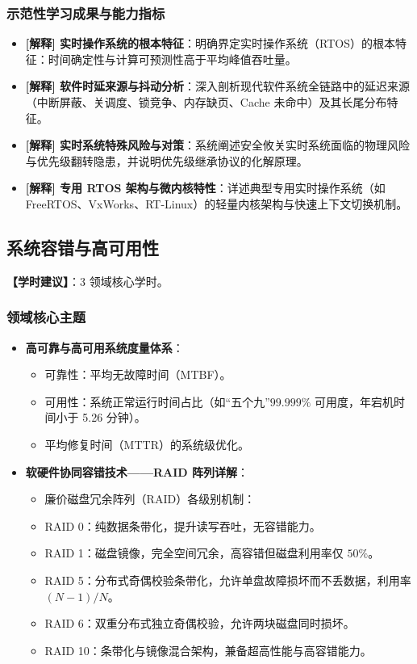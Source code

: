 \subsubsection{示范性学习成果与能力指标}
\begin{itemize}\setlength{\itemsep}{0pt}\setlength{\parskip}{0pt}
    \item \textbf{[解释] 实时操作系统的根本特征}：明确界定实时操作系统（RTOS）的根本特征：时间确定性与计算可预测性高于平均峰值吞吐量。
    \item \textbf{[解释] 软件时延来源与抖动分析}：深入剖析现代软件系统全链路中的延迟来源（中断屏蔽、关调度、锁竞争、内存缺页、Cache 未命中）及其长尾分布特征。
    \item \textbf{[解释] 实时系统特殊风险与对策}：系统阐述安全攸关实时系统面临的物理风险与优先级翻转隐患，并说明优先级继承协议的化解原理。
    \item \textbf{[解释] 专用 RTOS 架构与微内核特性}：详述典型专用实时操作系统（如 FreeRTOS、VxWorks、RT-Linux）的轻量内核架构与快速上下文切换机制。
\end{itemize}

\subsection{系统容错与高可用性}
\textbf{【学时建议】}：3 领域核心学时。

\subsubsection{领域核心主题}
\begin{itemize}\setlength{\itemsep}{0pt}\setlength{\parskip}{0pt}
    \item \textbf{高可靠与高可用系统度量体系}：
    \begin{itemize}\setlength{\itemsep}{0pt}\setlength{\parskip}{0pt}
        \item 可靠性：平均无故障时间（MTBF）。
        \item 可用性：系统正常运行时间占比（如“五个九”$99.999\%$ 可用度，年宕机时间小于 5.26 分钟）。
        \item 平均修复时间（MTTR）的系统级优化。
    \end{itemize}
    \item \textbf{软硬件协同容错技术——RAID 阵列详解}：
    \begin{itemize}\setlength{\itemsep}{0pt}\setlength{\parskip}{0pt}
        \item 廉价磁盘冗余阵列（RAID）各级别机制：
        \item RAID 0：纯数据条带化，提升读写吞吐，无容错能力。
        \item RAID 1：磁盘镜像，完全空间冗余，高容错但磁盘利用率仅 $50\%$。
        \item RAID 5：分布式奇偶校验条带化，允许单盘故障损坏而不丢数据，利用率 $(N-1)/N$。
        \item RAID 6：双重分布式独立奇偶校验，允许两块磁盘同时损坏。
        \item RAID 10：条带化与镜像混合架构，兼备超高性能与高容错能力。
    \end{itemize}
\end{itemize}

